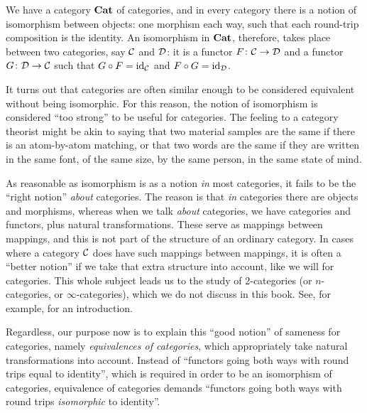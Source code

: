 \documentclass[CT4S-EN-RU]{subfiles}
\begin{document}
\begin{blockENG}
We have a category ${\bf Cat}$ of categories, and in every category there is a notion of isomorphism between objects: one morphism each way, such that each round-trip composition is the identity. An isomorphism in ${\bf Cat}$, therefore, takes place between two categories, say $\mathcal{C}$ and $\mathcal{D}$: it is a functor $F\colon\mathcal{C}\rightarrow\mathcal{D}$ and a functor $G\colon\mathcal{D}\rightarrow\mathcal{C}$ such that $G\circ F=\textnormal{id}_\mathcal{C}$ and $F\circ G=\textnormal{id}_\mathcal{D}$. 
\end{blockENG}

\begin{blockRUS}
\end{blockRUS}

\begin{blockENG}
It turns out that categories are often similar enough to be considered equivalent without being isomorphic. For this reason, the notion of isomorphism is considered “too strong” to be useful for categories. The feeling to a category theorist might be akin to saying that two material samples are the same if there is an atom-by-atom matching, or that two words are the same if they are written in the same font, of the same size, by the same person, in the same state of mind. 
\end{blockENG}

\begin{blockRUS}
\end{blockRUS}

\begin{blockENG}
As reasonable as isomorphism is as a notion {\em in} most categories, it fails to be the “right notion” {\em about} categories. The reason is that {\em in} categories there are objects and morphisms, whereas when we talk {\em about} categories, we have categories and functors, plus natural transformations. These serve as mappings between mappings, and this is not part of the structure of an ordinary category. In cases where a category $\mathcal{C}$ does have such mappings between mappings, it is often a “better notion” if we take that extra structure into account, like we will for categories. This whole subject leads us to the study of 2-categories (or $n$-categories, or $\infty$-categories), which we do not discuss in this book. See, for example, \cite{Le1} for an introduction.
\end{blockENG}

\begin{blockRUS}
\end{blockRUS}

\begin{blockENG}
Regardless, our purpose now is to explain this “good notion” of sameness for categories, namely {\em equivalences of categories}, which appropriately take natural transformations into account. Instead of “functors going both ways with round trips equal to identity”, which is required in order to be an isomorphism of categories, equivalence of categories demands “functors going both ways with round trips {\em isomorphic} to identity”.
\end{blockENG}
\end{document}
